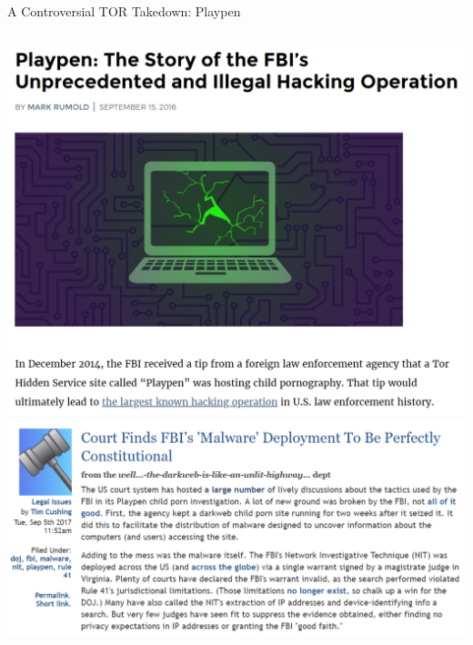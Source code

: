 \documentclass[nobackground,dvipsnames,table]{beamer}
\begin{document}
\begin{frame}{A Controversial TOR Takedown: Playpen}
    \begin{columns}
            \includegraphics[width=1.5\textwidth]{playpen-article}
            \includegraphics[width=\textwidth]{playpen-court-article}
    \end{columns}
\end{frame}
\end{document}

